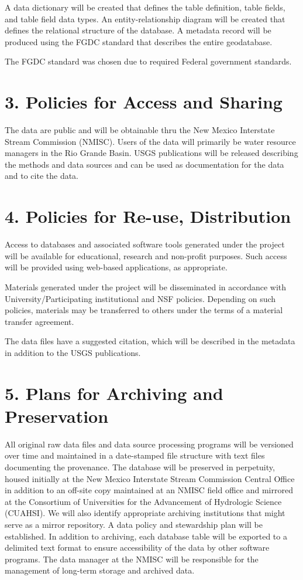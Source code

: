 \documentclass[]{article}
\begin{document}
A data dictionary will be created that defines the table definition,
table fields, and table field data types. An entity-relationship diagram
will be created that defines the relational structure of the database. A
metadata record will be produced using the FGDC standard that describes
the entire geodatabase.

The FGDC standard was chosen due to required Federal government
standards.

\section{3. Policies for Access and
Sharing}\label{policies-for-access-and-sharing}

The data are public and will be obtainable thru the New Mexico
Interstate Stream Commission (NMISC). Users of the data will primarily
be water resource managers in the Rio Grande Basin. USGS publications
will be released describing the methods and data sources and can be used
as documentation for the data and to cite the data.

\section{4. Policies for Re-use,
Distribution}\label{policies-for-re-use-distribution}

Access to databases and associated software tools generated under the
project will be available for educational, research and non-profit
purposes. Such access will be provided using web-based applications, as
appropriate.

Materials generated under the project will be disseminated in accordance
with University/Participating institutional and NSF policies. Depending
on such policies, materials may be transferred to others under the terms
of a material transfer agreement.

The data files have a suggested citation, which will be described in the
metadata in addition to the USGS publications.

\section{5. Plans for Archiving and
Preservation}\label{plans-for-archiving-and-preservation}

All original raw data files and data source processing programs will be
versioned over time and maintained in a date-stamped file structure with
text files documenting the provenance. The database will be preserved in
perpetuity, housed initially at the New Mexico Interstate Stream
Commission Central Office in addition to an off-site copy maintained at
an NMISC field office and mirrored at the Consortium of Universities for
the Advancement of Hydrologic Science (CUAHSI). We will also identify
appropriate archiving institutions that might serve as a mirror
repository. A data policy and stewardship plan will be established. In
addition to archiving, each database table will be exported to a
delimited text format to ensure accessibility of the data by other
software programs. The data manager at the NMISC will be responsible for
the management of long-term storage and archived data.
\end{document}
